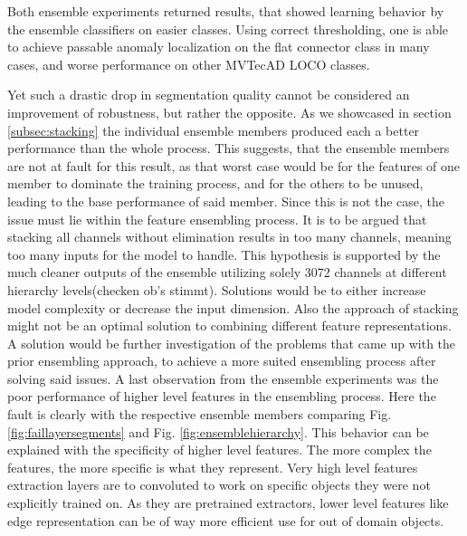 Both ensemble experiments returned results, that showed learning behavior by the ensemble classifiers on easier classes. Using correct thresholding, one is able to achieve passable 
anomaly localization on the flat connector class in many cases, and worse performance on other MVTecAD LOCO \cite{LOCODentsAndScratchesBergmann2022} classes.

Yet such a drastic drop in segmentation quality cannot be considered an improvement of robustness, but rather the opposite. As we showcased in 
section \ref{subsec:stacking} the individual ensemble members produced each a better performance than the whole process. 
This suggests, that the ensemble members are not at fault for this result, as that worst case would be for the features of one member to dominate the training process, 
and for the others to be unused, leading to the base performance of said member. Since this is not the case, the issue must lie within the feature ensembling process. 
It is to be argued that stacking all channels without elimination results in too many channels, meaning too many inputs for the model to handle. This hypothesis is 
supported by the much cleaner outputs of the ensemble utilizing solely 3072 channels at different hierarchy levels(checken ob's stimmt). Solutions would be to either 
increase model complexity or decrease the input dimension. Also the approach of stacking might not be an optimal solution to combining different feature representations. 
A solution would be further investigation of the problems that came up with the prior ensembling approach, to achieve a more suited ensembling process after solving said 
issues. \newline 
A last observation from the ensemble experiments was the poor performance of higher level features in the ensembling process. 
Here the fault is clearly with the respective ensemble members comparing Fig. \ref{fig:faillayersegments} and Fig. \ref{fig:ensemblehierarchy}. This behavior can be explained 
with the specificity of higher level features. The more complex the features, the more specific is what they represent. Very high level features extraction layers are to 
convoluted to work on specific objects they were not explicitly trained on. As they are pretrained extractors, lower level features like edge representation can be of way 
more efficient use for out of domain objects. \newline 





